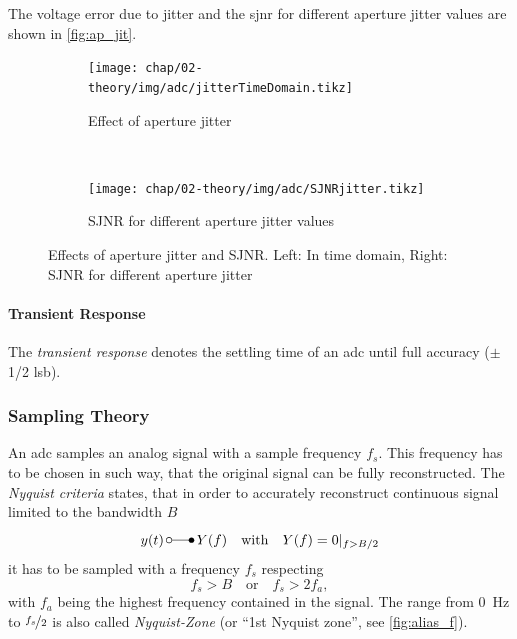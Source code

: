 The voltage error due to jitter and the \gls{sjnr} for different aperture jitter values are shown in \autoref{fig:ap_jit}.

\begin{figure}[tb]
	\centering
	\begin{subfigure}{\textwidth}
		\centering
		\texttt{[image: chap/02-theory/img/adc/jitterTimeDomain.tikz]}  
		\caption{Effect of aperture jitter}
		\label{fig:jitter}
	\end{subfigure}
	\\[4ex]
	\begin{subfigure}{\textwidth}
		\centering
		\texttt{[image: chap/02-theory/img/adc/SJNRjitter.tikz]}  
		\caption{SJNR for different aperture jitter values}
		\label{fig:sjnr}
	\end{subfigure}
	\caption[Aperture jitter and SJNR]{Effects of aperture jitter and SJNR. Left: In time domain, Right: SJNR for different aperture jitter \cite{Lundberg}}
	\label{fig:ap_jit}
\end{figure}

\paragraph{Transient Response}
The \textit{transient response} denotes the settling time of an \gls{adc} until full accuracy ($\pm$ 1/2 \gls{lsb}).


\subsubsection{Sampling Theory}
An \gls{adc} samples an analog signal with a sample frequency $f_s$.
This frequency has to be chosen in such way, that the original signal can be fully reconstructed.
The \textit{Nyquist criteria} states, that in order to accurately reconstruct continuous signal limited to the bandwidth $B$
\begin{equation}
	y (t) \, \laplace \,  Y(f) \quad \text{with} \quad Y(f)=0\vert_{f>B/2}
\end{equation} 
it has to be sampled with a frequency $f_s$ respecting
\begin{equation} \label{eq:nyquist}
	f_s > B \quad \text{or} \quad f_s > 2 f_a,
\end{equation}
with $f_a$ being the highest frequency contained in the signal. \cite{walt,puente2015}
The range from \SI{0}{\Hz} to $\nicefrac{f_s}{2}$ is also called \textit{Nyquist-Zone} (or ``1st Nyquist zone'', see \autoref{fig:alias_f}).


